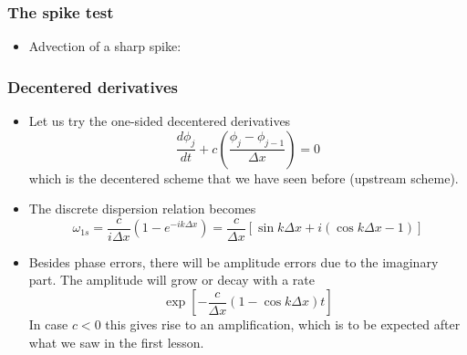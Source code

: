 \documentclass[aspectratio=149,9pt]{beamer}
\begin{document}
%
%
\begin{frame}
	\frametitle{The spike test}
	\vfill\begin{itemize}
		\item Advection of a sharp spike:
			\begin{center}
				\scalebox{.8}{}
			\end{center}
	\end{itemize}\vfill
\end{frame}
%
%
\begin{frame}
	\frametitle{Decentered derivatives}
	\vfill\begin{itemize}
		\item Let us try the one-sided decentered derivatives
			\begin{equation*}
				\frac{d \phi_j}{dt} + c \left(\frac{\phi_j - \phi_{j-1}}{\Delta x} \right) =0
			\end{equation*}
			which is the decentered scheme that we have seen before (upstream scheme).\vfill
		\item The discrete dispersion relation becomes
			\begin{equation*}
				\omega_{1s} = \frac{c}{i \Delta x} \left(1 - e^{- i k \Delta x}\right) 
					= \frac{c}{\Delta x}	\left[\sin k \Delta x +	i \left(\cos k \Delta x -1	\right)\right]
			\end{equation*}\vfill
		\item Besides phase errors, there will be amplitude errors due to the imaginary part. The amplitude will grow or decay with a rate
			\begin{equation*}
				\exp \left[ - \frac{c}{\Delta x} \left( 1 - \cos k \Delta x \right) t \right]
			\end{equation*}
			In case $c<0$ this gives rise to an amplification, which is to be expected after what we saw in the first lesson.
	\end{itemize}\vfill
\end{frame}
%
%
\end{document}
